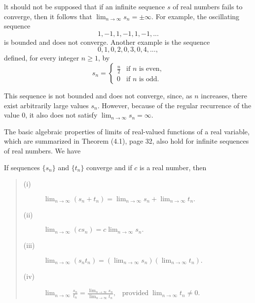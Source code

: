 lt should not be supposed that if an infinite sequence $s$ of real numbers fails to converge, then it follows that $\lim_{n \rightarrow \infty} s_n = \pm \infty$. For example, the oscillating sequence    
$$
1, -1, 1, -1, 1, -1, ...
$$
\noindent is bounded and does not converge. Another example is the sequence 
$$
0,1,0,2,0,3,0,4, ... ,
$$
\noindent defined, for every integer $n \geq 1$, by
$$
s_n = \left\{ \begin{array}{ll}
\frac{n}{2} &  \mbox{if $n$ is even,} \\
0               & \mbox{if $n$ is odd.}
\end{array}
\right .
$$

\noindent This sequence is not bounded and does not converge, since, as $n$ increases, there exist arbitrarily large values $s_n$. However, because of the regular recurrence of the value 0, it also does not satisfy $\lim_{n \rightarrow \infty} s_n = \infty$.

The basic algebraic properties of limits of real-valued functions of a real variable, which are summarized in Theorem (4.1), page 32, also hold for infinite sequences of real numbers. We have

\begin{theorem} If sequences $\{s_n\}$ and $\{t_n\}$ converge and if $c$ is a real number, then
 
\begin{quote}
\begin{description}
\item[(i)]  $\lim_{n \rightarrow \infty} (s_n + t_n) = \lim_{n \rightarrow \infty} s_n + \lim_{n \rightarrow \infty} t_n.$
\item[(ii)]  $\lim_{n \rightarrow \infty} (cs_n) = c \lim_{n \rightarrow \infty} s_n.$
\item[(iii)]  $\lim_{n \rightarrow \infty} (s_n t_n) = (\lim_{n \rightarrow \infty} s_n)(\lim_{n \rightarrow \infty} t_n).$
\item[(iv)]  $\lim_{n \rightarrow \infty} \frac{s_n}{t_n}  = \frac{\lim_{n \rightarrow \infty} s_n}{\lim_{n \rightarrow \infty} t_n}, \;\;\; \mbox{provided} \; \lim_{n \rightarrow \infty} t_n \neq 0.$  
\end{description}
\end{quote} 
\end{theorem}

